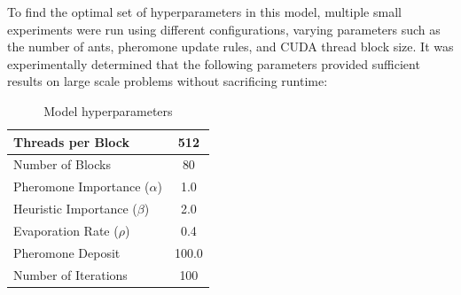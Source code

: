 \documentclass[11pt]{report}
\begin{document}
    To find the optimal set of hyperparameters in this model, multiple small experiments were run using different configurations, varying parameters such as the number of ants, pheromone update rules, and CUDA thread block size. It was experimentally determined that the following parameters provided sufficient results on large scale problems without sacrificing runtime:
    \begin{table}[h]
    \centering
    \label{tab:hyperparameters}
    \begin{tabular}{|l|c|}
        \hline
        Threads per Block & 512 \\
        \hline
        Number of Blocks & 80 \\
        \hline
        Pheromone Importance ($\alpha$) & 1.0\\
        \hline
        Heuristic Importance ($\beta$) & 2.0\\
        \hline
        Evaporation Rate ($\rho$) & 0.4\\
        \hline
        Pheromone Deposit & 100.0\\
        \hline
        Number of Iterations & 100\\
         \hline
    \end{tabular}
    \caption{Model hyperparameters}
    \end{table}
    \\
\end{document}
